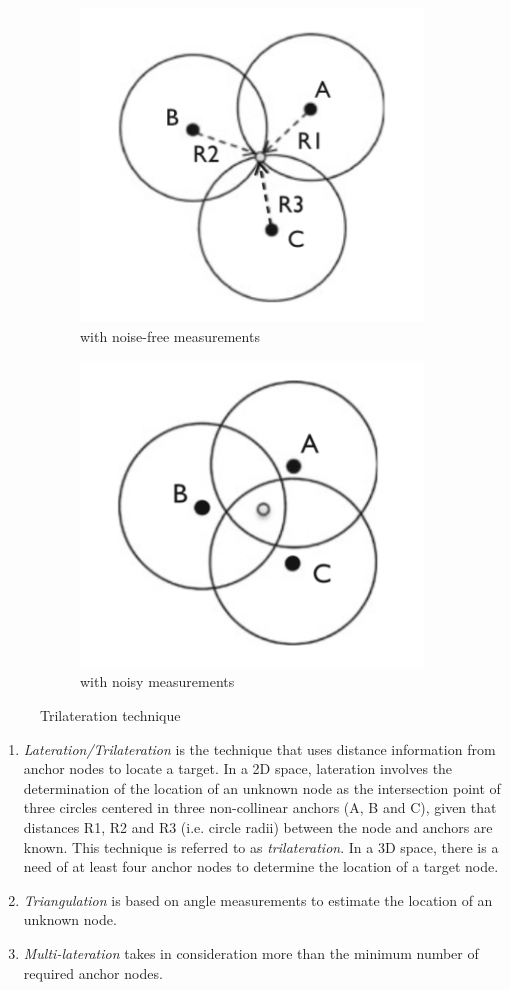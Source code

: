\documentclass[a4paper,12pt]{article}
\begin{document}
\begin{enumerate}
  \begin{figure}[b]
    \centering
    \begin{subfigure}{.5\textwidth}
      \centering
      \includegraphics[width=.4\linewidth]{img/noise-free-lateration}
      \caption{with noise-free measurements}
    \end{subfigure}%
    \begin{subfigure}{.5\textwidth}
      \centering
      \includegraphics[width=.4\linewidth]{img/lateration}
      \caption{with noisy measurements}
    \end{subfigure}
    \caption{Trilateration technique}
  \end{figure}

  \begin{enumerate}[label=(\roman*)]
    \item \textit{Lateration/Trilateration} is the technique that uses distance information from anchor nodes to locate a target. In a 2D space, lateration involves the determination of the location of an unknown node as the intersection point of three circles centered in three non-collinear anchors (A, B and C), given that distances R1, R2 and R3 (i.e. circle radii) between the node and anchors are known. This technique is referred to as \textit{trilateration}. In a 3D space, there is a need of at least four anchor nodes to determine the location of a target node.
    \item \textit{Triangulation} is based on angle measurements to estimate the location of an unknown node.
    \item \textit{Multi-lateration} takes in consideration more than the minimum number of required anchor nodes.
  \end{enumerate}
\end{enumerate}
\end{document}
